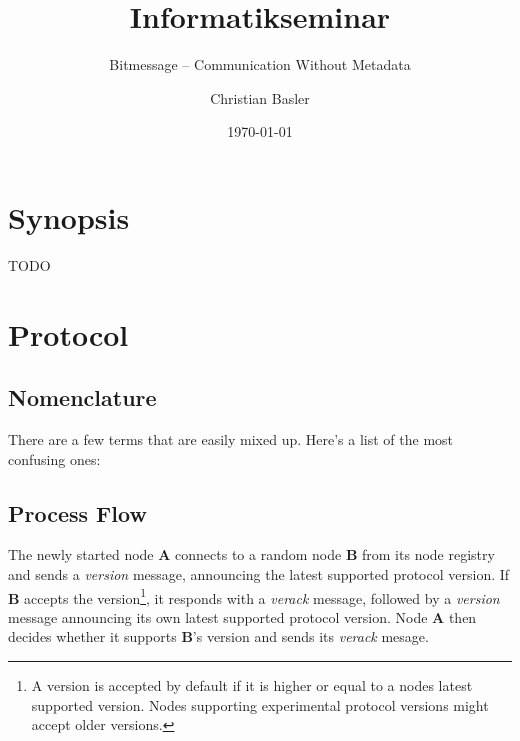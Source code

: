 \documentclass{bfh}
\title{Informatikseminar}
\subtitle{Bitmessage -- Communication Without Metadata}
\author{Christian Basler}
\date{\today}
\newcommand{\msg}[1]{\textit{#1}}
\newcommand{\node}[1]{\textbf{#1}}
\begin{document}
  \maketitle

  \tableofcontents

  \section{Synopsis}

  TODO


  


  \section{Protocol}

  \subsection{Nomenclature}

  There are a few terms that are easily mixed up. Here's a list of the most confusing ones:


  \subsection{Process Flow}

  The newly started node \node{A} connects to a random node \node{B} from its node registry and sends a \msg{version} message, announcing the latest supported protocol version. If \node{B} accepts the version\footnote{A version is accepted by default if it is higher or equal to a nodes latest supported version. Nodes supporting experimental protocol versions might accept older versions.}, it responds with a \msg{verack} message, followed by a \msg{version} message announcing its own latest supported protocol version. Node \node{A} then decides whether it supports \node{B}'s version and sends its \msg{verack} mesage.
\end{document}

